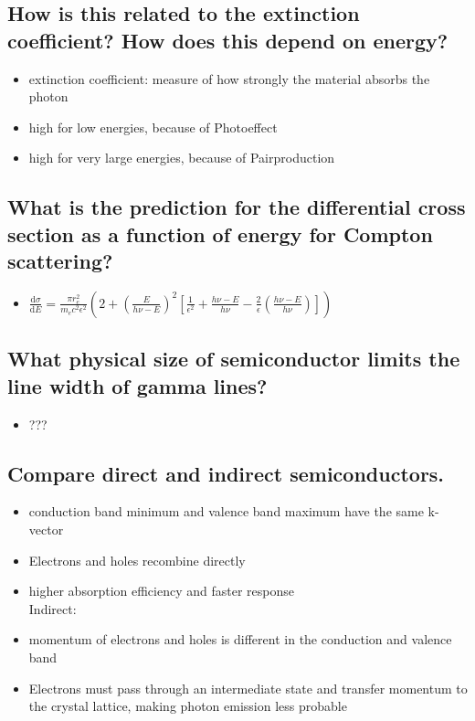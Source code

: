 \subsection*{How is this related to the extinction coefficient? How does this depend on energy?}
\begin{itemize}
    \item extinction coefficient: measure of how strongly the material
    absorbs the photon
    \item high for low energies, because of Photoeffect
    \item high for very large energies, because of Pairproduction
\end{itemize}


\subsection*{What is the prediction for the differential cross section
as a function of energy for Compton scattering?}
\begin{itemize}
    \item $\frac{\text{d}\sigma}{\text{d}E}=\frac{\pi r_e^2}{m_ec^2\epsilon^2}\left(2+\left(\frac{E}{h\nu-E}\right)^2\left[\frac{1}{\epsilon^2}+\frac{h\nu-E}{h\nu}-\frac{2}{\epsilon}\left(\frac{h\nu-E}{h\nu}\right)\right]\right)$
\end{itemize}

\subsection*{What physical size of semiconductor limits the line width
of gamma lines?}
\begin{itemize}
    \item ???
\end{itemize}
\subsection*{Compare direct and indirect semiconductors.}
\begin{itemize}
    Direct:
    \item conduction band minimum and valence band maximum have the same k-vector 
    \item Electrons and holes recombine directly 
    \item higher absorption efficiency and faster response 
    \\
    Indirect: 
    \item momentum of electrons and holes is different in the conduction and valence band
    \item Electrons must pass through an intermediate state and transfer momentum to 
    the crystal lattice, making photon emission less probable
    
\end{itemize}
